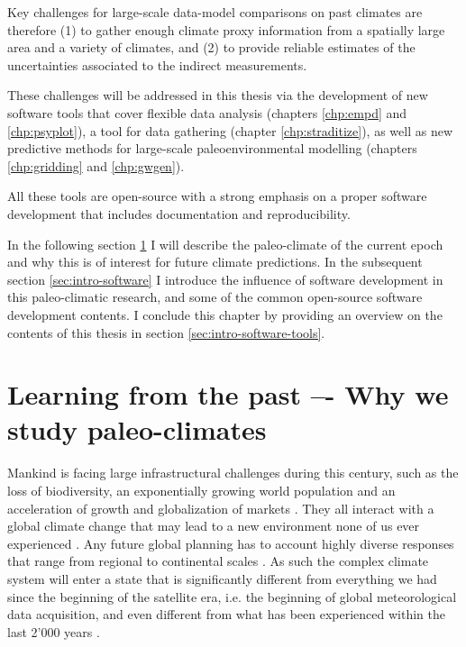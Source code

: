 \begin{refsection}
Key challenges for large-scale data-model comparisons on past climates are therefore (1) to gather enough climate proxy information from a spatially large area and a variety of climates, and (2) to provide reliable estimates of the uncertainties associated to the indirect measurements.

These challenges will be addressed in this thesis via the development of new software tools that cover flexible data analysis (chapters \ref{chp:empd} and \ref{chp:psyplot}), a tool for data gathering (chapter \ref{chp:straditize}), as well as new predictive methods for large-scale paleoenvironmental modelling (chapters \ref{chp:gridding} and \ref{chp:gwgen}).

All these tools are open-source with a strong emphasis on a proper software development that includes documentation and reproducibility. 

In the following section \ref{sec:intro-paleo} I will describe the paleo-climate of the current epoch and why this is of interest for future climate predictions. In the subsequent section \ref{sec:intro-software} I introduce the influence of software development in this paleo-climatic research, and some of the common open-source software development contents. I conclude this chapter by providing an overview on the contents of this thesis in section \ref{sec:intro-software-tools}.

\section{Learning from the past –- Why we study paleo-climates} \label{sec:intro-paleo}

Mankind is facing large infrastructural challenges during this century, such as the loss of biodiversity, an exponentially growing world population and an acceleration of growth and globalization of markets \citep[e.g.][]{CeballosEhrlichBarnoskyEtAl2015, UniNations2019, WorldBank2002}. They all interact with a global climate change that may lead to a new environment none of us ever experienced \citep{CollinsKnuttiArblasterEtAl2013}. Any future global planning has to account highly diverse responses that range from regional to continental scales \citep{ChristensenKrishnaKumarAldrianEtAl2013}. As such the complex climate system will enter a state that is significantly different from everything we had since the beginning of the satellite era, i.e. the beginning of global meteorological data acquisition, and even different from what has been experienced within the last 2'000 years \citep{NeukomSteigerGomezNavarroEtAl2019, NeukomBarbozaErbEtAl2019}.


\end{refsection}
